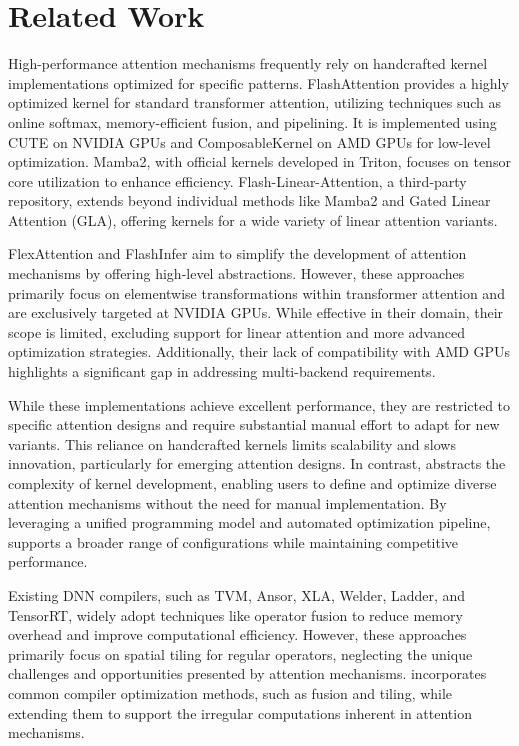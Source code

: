 \vspace{-2mm}
\section{Related Work}
\vspace{-2mm}

High-performance attention mechanisms frequently rely on handcrafted kernel implementations optimized for specific patterns. FlashAttention\cite{dao2022flashattention} provides a highly optimized kernel for standard transformer attention, utilizing techniques such as online softmax, memory-efficient fusion, and pipelining. It is implemented using CUTE\cite{nvidia2024cutlass} on NVIDIA GPUs and ComposableKernel on AMD GPUs for low-level optimization.  Mamba2\cite{dao2024mamba2}, with official kernels developed in Triton\cite{triton}, focuses on tensor core utilization to enhance efficiency. Flash-Linear-Attention\cite{yang2024fla}, a third-party repository, extends beyond individual methods like Mamba2 and Gated Linear Attention (GLA), offering kernels for a wide variety of linear attention variants.

FlexAttention\cite{dong2024flexattentionprogrammingmodel} and FlashInfer\cite{ye2025flashinferefficientcustomizableattention} aim to simplify the development of attention mechanisms by offering high-level abstractions. However, these approaches primarily focus on elementwise transformations within transformer attention and are exclusively targeted at NVIDIA GPUs. While effective in their domain, their scope is limited, excluding support for linear attention and more advanced optimization strategies. Additionally, their lack of compatibility with AMD GPUs highlights a significant gap in addressing multi-backend requirements.

While these implementations achieve excellent performance, they are restricted to specific attention designs and require substantial manual effort to adapt for new variants. This reliance on handcrafted kernels limits scalability and slows innovation, particularly for emerging attention designs. In contrast, \oursys{} abstracts the complexity of kernel development, enabling users to define and optimize diverse attention mechanisms without the need for manual implementation. By leveraging a unified programming model and automated optimization pipeline, \oursys{} supports a broader range of configurations while maintaining competitive performance.

Existing DNN compilers, such as TVM\cite{tvm2018}, Ansor\cite{ansor}, XLA\cite{xla}, Welder\cite{shi2023welder}, Ladder\cite{wang2024ladder}, and TensorRT\cite{tensorrt}, widely adopt techniques like operator fusion to reduce memory overhead and improve computational efficiency. However, these approaches primarily focus on spatial tiling for regular operators, neglecting the unique challenges and opportunities presented by attention mechanisms. \oursys{} incorporates common compiler optimization methods, such as fusion and tiling, while extending them to support the irregular computations inherent in attention mechanisms. 

